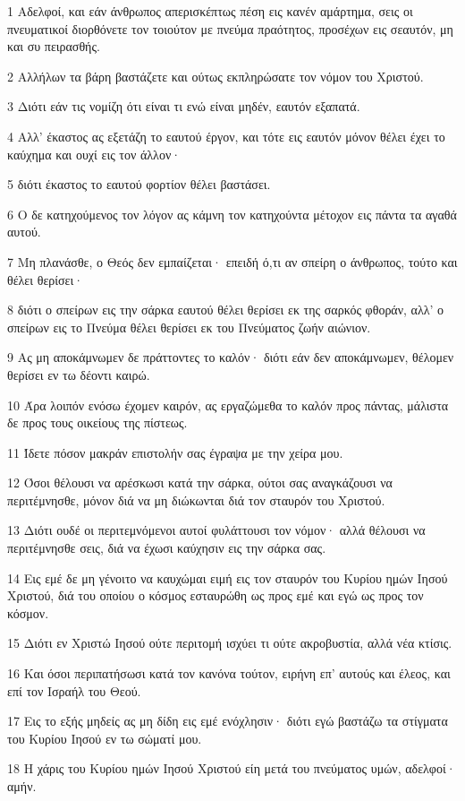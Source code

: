 \par 1 Αδελφοί, και εάν άνθρωπος απερισκέπτως πέση εις κανέν αμάρτημα, σεις οι πνευματικοί διορθόνετε τον τοιούτον με πνεύμα πραότητος, προσέχων εις σεαυτόν, μη και συ πειρασθής.
\par 2 Αλλήλων τα βάρη βαστάζετε και ούτως εκπληρώσατε τον νόμον του Χριστού.
\par 3 Διότι εάν τις νομίζη ότι είναι τι ενώ είναι μηδέν, εαυτόν εξαπατά.
\par 4 Αλλ' έκαστος ας εξετάζη το εαυτού έργον, και τότε εις εαυτόν μόνον θέλει έχει το καύχημα και ουχί εις τον άλλον·
\par 5 διότι έκαστος το εαυτού φορτίον θέλει βαστάσει.
\par 6 Ο δε κατηχούμενος τον λόγον ας κάμνη τον κατηχούντα μέτοχον εις πάντα τα αγαθά αυτού.
\par 7 Μη πλανάσθε, ο Θεός δεν εμπαίζεται· επειδή ό,τι αν σπείρη ο άνθρωπος, τούτο και θέλει θερίσει·
\par 8 διότι ο σπείρων εις την σάρκα εαυτού θέλει θερίσει εκ της σαρκός φθοράν, αλλ' ο σπείρων εις το Πνεύμα θέλει θερίσει εκ του Πνεύματος ζωήν αιώνιον.
\par 9 Ας μη αποκάμνωμεν δε πράττοντες το καλόν· διότι εάν δεν αποκάμνωμεν, θέλομεν θερίσει εν τω δέοντι καιρώ.
\par 10 Άρα λοιπόν ενόσω έχομεν καιρόν, ας εργαζώμεθα το καλόν προς πάντας, μάλιστα δε προς τους οικείους της πίστεως.
\par 11 Ίδετε πόσον μακράν επιστολήν σας έγραψα με την χείρα μου.
\par 12 Όσοι θέλουσι να αρέσκωσι κατά την σάρκα, ούτοι σας αναγκάζουσι να περιτέμνησθε, μόνον διά να μη διώκωνται διά τον σταυρόν του Χριστού.
\par 13 Διότι ουδέ οι περιτεμνόμενοι αυτοί φυλάττουσι τον νόμον· αλλά θέλουσι να περιτέμνησθε σεις, διά να έχωσι καύχησιν εις την σάρκα σας.
\par 14 Εις εμέ δε μη γένοιτο να καυχώμαι ειμή εις τον σταυρόν του Κυρίου ημών Ιησού Χριστού, διά του οποίου ο κόσμος εσταυρώθη ως προς εμέ και εγώ ως προς τον κόσμον.
\par 15 Διότι εν Χριστώ Ιησού ούτε περιτομή ισχύει τι ούτε ακροβυστία, αλλά νέα κτίσις.
\par 16 Και όσοι περιπατήσωσι κατά τον κανόνα τούτον, ειρήνη επ' αυτούς και έλεος, και επί τον Ισραήλ του Θεού.
\par 17 Εις το εξής μηδείς ας μη δίδη εις εμέ ενόχλησιν· διότι εγώ βαστάζω τα στίγματα του Κυρίου Ιησού εν τω σώματί μου.
\par 18 Η χάρις του Κυρίου ημών Ιησού Χριστού είη μετά του πνεύματος υμών, αδελφοί· αμήν.


